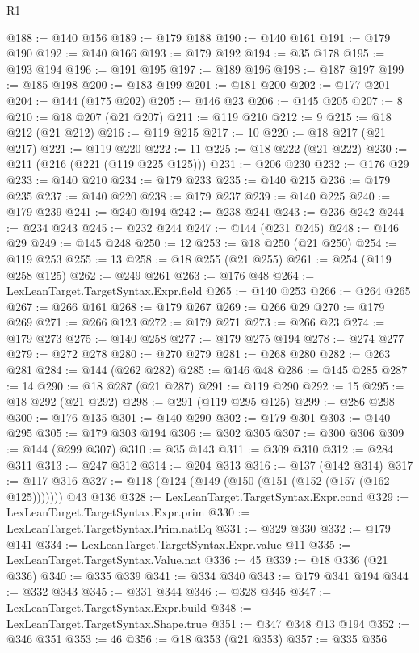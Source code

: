 \begin{lexlean}{R1}
\begin{coremodule}
@188 := @140 @156
@189 := @179 @188
@190 := @140 @161
@191 := @179 @190
@192 := @140 @166
@193 := @179 @192
@194 := @35 @178
@195 := @193 @194
@196 := @191 @195
@197 := @189 @196
@198 := @187 @197
@199 := @185 @198
@200 := @183 @199
@201 := @181 @200
@202 := @177 @201
@204 := @144 (@175 @202)
@205 := @146 @23
@206 := @145 @205
@207 := 8
@210 := @18 @207 (@21 @207)
@211 := @119 @210
@212 := 9
@215 := @18 @212 (@21 @212)
@216 := @119 @215
@217 := 10
@220 := @18 @217 (@21 @217)
@221 := @119 @220
@222 := 11
@225 := @18 @222 (@21 @222)
@230 := @211 (@216 (@221 (@119 @225 @125)))
@231 := @206 @230
@232 := @176 @29
@233 := @140 @210
@234 := @179 @233
@235 := @140 @215
@236 := @179 @235
@237 := @140 @220
@238 := @179 @237
@239 := @140 @225
@240 := @179 @239
@241 := @240 @194
@242 := @238 @241
@243 := @236 @242
@244 := @234 @243
@245 := @232 @244
@247 := @144 (@231 @245)
@248 := @146 @29
@249 := @145 @248
@250 := 12
@253 := @18 @250 (@21 @250)
@254 := @119 @253
@255 := 13
@258 := @18 @255 (@21 @255)
@261 := @254 (@119 @258 @125)
@262 := @249 @261
@263 := @176 @48
@264 := LexLeanTarget.TargetSyntax.Expr.field
@265 := @140 @253
@266 := @264 @265
@267 := @266 @161
@268 := @179 @267
@269 := @266 @29
@270 := @179 @269
@271 := @266 @123
@272 := @179 @271
@273 := @266 @23
@274 := @179 @273
@275 := @140 @258
@277 := @179 @275 @194
@278 := @274 @277
@279 := @272 @278
@280 := @270 @279
@281 := @268 @280
@282 := @263 @281
@284 := @144 (@262 @282)
@285 := @146 @48
@286 := @145 @285
@287 := 14
@290 := @18 @287 (@21 @287)
@291 := @119 @290
@292 := 15
@295 := @18 @292 (@21 @292)
@298 := @291 (@119 @295 @125)
@299 := @286 @298
@300 := @176 @135
@301 := @140 @290
@302 := @179 @301
@303 := @140 @295
@305 := @179 @303 @194
@306 := @302 @305
@307 := @300 @306
@309 := @144 (@299 @307)
@310 := @35 @143
@311 := @309 @310
@312 := @284 @311
@313 := @247 @312
@314 := @204 @313
@316 := @137 (@142 @314)
@317 := @117 @316
@327 := @118 (@124 (@149 (@150 (@151 (@152 (@157 (@162 @125))))))) @43 @136
@328 := LexLeanTarget.TargetSyntax.Expr.cond
@329 := LexLeanTarget.TargetSyntax.Expr.prim
@330 := LexLeanTarget.TargetSyntax.Prim.natEq
@331 := @329 @330
@332 := @179 @141
@334 := LexLeanTarget.TargetSyntax.Expr.value @11
@335 := LexLeanTarget.TargetSyntax.Value.nat
@336 := 45
@339 := @18 @336 (@21 @336)
@340 := @335 @339
@341 := @334 @340
@343 := @179 @341 @194
@344 := @332 @343
@345 := @331 @344
@346 := @328 @345
@347 := LexLeanTarget.TargetSyntax.Expr.build
@348 := LexLeanTarget.TargetSyntax.Shape.true
@351 := @347 @348 @13 @194
@352 := @346 @351
@353 := 46
@356 := @18 @353 (@21 @353)
@357 := @335 @356

\end{coremodule}
\end{lexlean}
